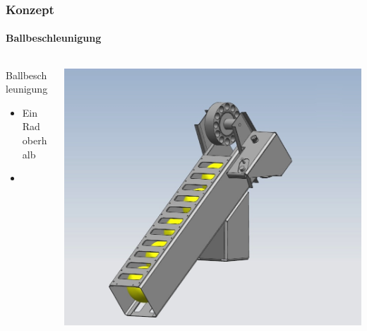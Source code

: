 \begin{frame}
    \frametitle{Konzept}
    \framesubtitle{Ballbeschleunigung}
    \begin{columns}
        \begin{column}{0.4\textwidth}
            \begin{block}{Ballbeschleunigung}
                \begin{itemize}
                    \item Ein Rad oberhalb
                    \item[ ] ~
                \end{itemize}
            \end{block}
            \centering
            \rule{0pt}{0.8\textwidth}
        \end{column}
        \begin{column}{0.6\textwidth}
            \centering
            \includegraphics[height=0.8\textwidth, trim = 40mm 0mm 60mm 30mm, clip]{../doc/fig/Balllager.jpg}
        \end{column}
    \end{columns}
\end{frame}


